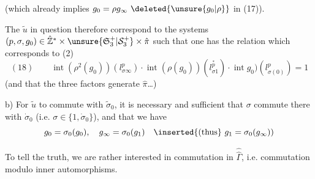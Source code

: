 (which already implies $g_0=\rho g_\infty\ \deleted{\unsure{g_0|\rho}}$ in (17)).

The $\tilde u$ in question therefore correspond to the systems $(p,\sigma,g_0)\in\hat{\mathbb Z}^*\times\unsure{\mathfrak S_3^+|\mathcal S_3^+}\times\hat\pi$ such that one has the relation which corresponds to (2)
\[
(18)\qquad\operatorname{int}(\rho^2(g_0))(l_{\sigma\infty}^p)\cdot\operatorname{int}(\rho(g_0))(l_{\sigma1}^{\overset{*}{p}})\cdot\operatorname{int}g_0)(l_{\sigma(0)}^p)=1
\]
(and that the three factors generate $\hat\pi$\ldots)

b) For $\tilde u$ to commute with $\tilde\sigma_0$, it is necessary and sufficient that $\sigma$ commute there with $\dot\sigma_0$ (i.e. $\sigma\in\{1,\dot\sigma_0\}$), and that we have
\[
g_0=\sigma_0(g_0),\quad g_\infty=\sigma_0(g_1)\quad\inserted{\text{(thus}}\ g_1=\sigma_0(g_\infty))
\]



To tell the truth, we are rather interested in commutation in $\widehat{\widehat\Gamma}$, i.e. commutation modulo inner automorphisms.
